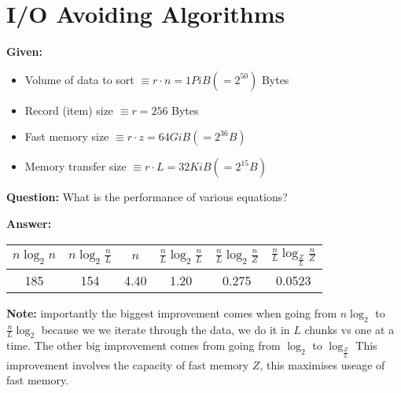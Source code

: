 \documentclass[../main.tex]{subfiles}
\begin{document}
    \section{I/O Avoiding Algorithms}
	\begin{mdframed}[style=Quiz]
		\textbf{Given:}
		\begin{itemize}
			\item Volume of data to sort $\equiv r \cdot n = 1 PiB (=2^{50})$ Bytes
			\item Record (item) size $\equiv r = 256$ Bytes
			\item Fast memory size $\equiv r \cdot z = 64 GiB (=2^{36}B)$
			\item Memory transfer size $\equiv r \cdot L = 32 KiB (=2^{15}B)$
		\end{itemize}
		
		\noindent
		\textbf{Question:} What is the performance of various equations?
		
		\noindent
		\textbf{Answer:}
		\begin{center}
			
			\begin{tabular}{cccccc}
				$n\log_2n$ & $n\log_2\frac{n}{L}$ & $n$ & $\frac{n}{L}\log_2\frac{n}{L}$ &$\frac{n}{L}\log_2\frac{n}{Z}$ &$\frac{n}{L}\log_{\frac{Z}{L}}\frac{n}{Z}$\\
				\hline
				185& 154& 4.40& 1.20 &0.275& 0.0523 \\
			\end{tabular}
		\end{center}
		
		\noindent
		\textbf{Note:} importantly the biggest improvement comes when going from $n\log_2$ to $\frac{n}{L}\log_2$ because we we iterate through the data, we do it in $L$ chunks vs one at a time. The other big improvement comes from going from $\log_2$ to $\log_{\frac{Z}{L}}$ This improvement involves the capacity of fast memory $Z$, this maximises useage of fast memory.
	\end{mdframed}
\end{document}
